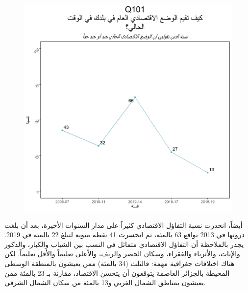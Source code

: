 \documentclass{article}
\begin{document}
	\pagebreak
	\begin{center}
	\begin{figure}[H]
		\centering
		\includegraphics[width=13cm]{Q101_.png}
	\end{figure}
	\end{center}

 أيضاً، انحدرت نسبة التفاؤل الاقتصادي كثيراً على مدار السنوات الأخيرة، بعد أن بلغت ذروتها في 2013 بواقع 63 بالمئة، ثم انحسرت 41 نقطة مئوية لتبلغ 22 بالمئة في 2019. يجدر بالملاحظة أن التفاؤل الاقتصادي متماثل في النسب بين الشباب والكبار، والذكور والإناث، والأثرياء والفقراء، وسكان الحضر والريف، والأعلى تعليماً والأقل تعليماً. لكن هناك اختلافات جغرافية مهمة: فالثلث (34 بالمئة) ممن يعيشون بالمنطقة الوسطى المحيطة بالجزائر العاصمة يتوقعون أن يتحسن الاقتصاد، مقارنة بـ 23 بالمئة ممن يعيشون بمناطق الشمال الغربي و13 بالمئة من سكان الشمال الشرقي.
	
\end{document}
